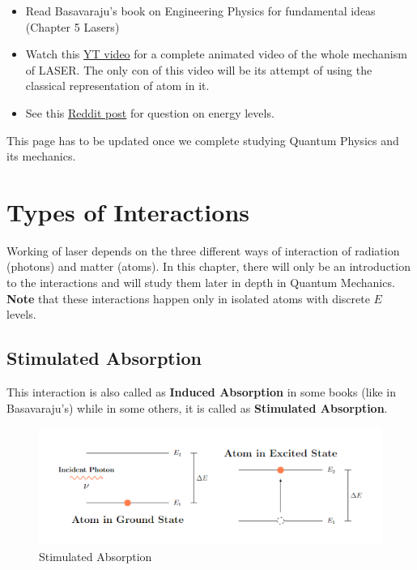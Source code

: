 \documentclass[12pt]{article}
\begin{document}
\begin{itemize}
    \item Read Basavaraju's book on Engineering Physics for fundamental ideas (Chapter 5 Lasers)
    \item Watch this \href{https://www.youtube.com/watch?v=_JOchLyNO_w&t=233s}{YT video} for a complete animated video of the whole mechanism of LASER. The only con of this video will be its attempt of using the classical representation of atom in it.
    \item See this \href{https://www.reddit.com/r/Physics/comments/1ev7gss/are_energy_levels_for_electrons_or_atoms/}{Reddit post} for question on energy levels.
\end{itemize}

This page has to be updated once we complete studying Quantum Physics and its mechanics.

\section{Types of Interactions}

Working of laser depends on the three different ways of interaction of radiation (photons) and matter (atoms). In this chapter, there will only be an introduction to the interactions and will study them later in depth in Quantum Mechanics. \textbf{Note} that these interactions happen only in isolated atoms with discrete $E$ levels.

\subsection{Stimulated Absorption}

This interaction is also called as \textbf{Induced Absorption} in some books (like in Basavaraju's) while in some others, it is called as \textbf{Stimulated Absorption}.

\begin{figure}[H]
    \centering
    \includegraphics[scale=0.8]{./img/03_induced_absorption.png}
    \caption{Stimulated Absorption}
\end{figure}
\end{document}
